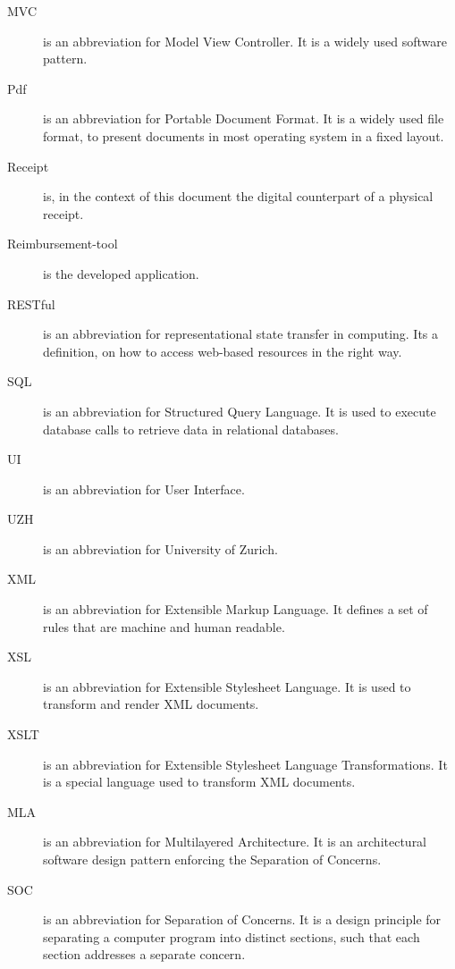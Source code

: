 \begin{description}
    \item[MVC] is an abbreviation for Model View Controller. It is a widely used software pattern.
    \item[Pdf] is an abbreviation for Portable Document Format. It is a widely used file format, to present documents in most operating system in a fixed layout.
    \item[Receipt] is, in the context of this document the digital counterpart of a physical receipt.
    \item[Reimbursement-tool] is the developed application.
    \item[RESTful] is an abbreviation for representational state transfer in computing. Its a definition, on how to access web-based resources in the right way.
    \item[SQL] is an abbreviation for Structured Query Language. It is used to execute database calls to retrieve data in relational databases.
    \item[UI] is an abbreviation for User Interface. 
    \item[UZH] is an abbreviation for University of Zurich.
    \item[XML] is an abbreviation for Extensible Markup Language. It defines a set of rules that are machine and human readable.
    \item[XSL] is an abbreviation for Extensible Stylesheet Language. It is used to transform and render XML documents.
    \item[XSLT] is an abbreviation for Extensible Stylesheet Language Transformations. It is a special language used to transform XML documents.
    \item[MLA] is an abbreviation for Multilayered Architecture. It is an architectural software design pattern enforcing the Separation of Concerns.
    \item[SOC] is an abbreviation for Separation of Concerns. It is a design principle for separating a computer program into distinct sections, such that each section addresses a separate concern\cite{soc}.
\end{description}
